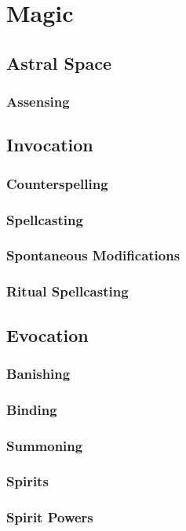\chapter{Magic}

\section{Astral Space}

\subsection{Assensing}

\section{Invocation}
\subsection{Counterspelling}
\subsection{Spellcasting}
\subsection{Spontaneous Modifications}
\subsection{Ritual Spellcasting}


\section{Evocation}
\subsection{Banishing}
\subsection{Binding}
\subsection{Summoning}
\subsection{Spirits}
\subsection{Spirit Powers}
